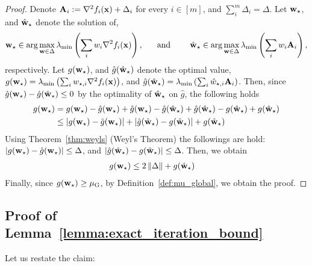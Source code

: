 \begin{proof}
    
Denote ${\mathbf{A}}_i := \nabla^2 f_i({\mathbf{x}}) + \Delta_i$ for every $i\in [m]$, and $\sum_i^m \Delta_i = \Delta$. Let ${\mathbf{w}}_\star $, and $\hat{{\mathbf{w}}}_\star$ denote the solution of,
    \begin{align*}
        {\mathbf{w}}_\star \in \arg\max_{{\mathbf{w}}\in \Delta} \lambda_{\min}\left(\sum_i w_i \nabla^2 f_i({\mathbf{x}})\right), ~~~~~ \text{and} ~~~~~~~ \hat{{\mathbf{w}}}_\star \in \arg\max_{{\mathbf{w}}\in \Delta} \lambda_{\min}\left(\sum_i w_i {\mathbf{A}}_i\right),
    \end{align*}
    respectively. Let $g({\mathbf{w}}_\star)$, and $\hat{g}(\hat{{\mathbf{w}}}_\star)$ denote the optimal value, $g({\mathbf{w}}_\star) = \lambda_{\min} \left(\sum_i w_{\star, i}  \nabla^2 f_i({\mathbf{x}})\right)$, and $\hat{g}(\hat{{\mathbf{w}}}_\star) = \lambda_{\min} \left(\sum_i \hat{w}_{\star, i} {\mathbf{A}}_i\right)$. Then, since $\hat{g}({\mathbf{w}}_\star) -\hat{g}(\hat{{\mathbf{w}}}_\star)\leq 0$ by the optimality of $\hat{{\mathbf{w}}}_\star$ on $\hat{g}$, the following holds
    \begin{align*}
        g({\mathbf{w}}_\star) & = g({\mathbf{w}}_\star) - \hat{g}({\mathbf{w}}_\star) + \hat{g}({\mathbf{w}}_\star) -\hat{g}(\hat{{\mathbf{w}}}_\star) +\hat{g}(\hat{{\mathbf{w}}}_\star) - g(\hat{{\mathbf{w}}}_\star) +g(\hat{{\mathbf{w}}}_\star) \\
        & \leq |g({\mathbf{w}}_\star) - \hat{g}({\mathbf{w}}_\star)|  + |\hat{g}(\hat{{\mathbf{w}}}_\star) - g(\hat{{\mathbf{w}}}_\star)| +g(\hat{{\mathbf{w}}}_\star)\\
    \end{align*}
    Using Theorem~\ref{thm:weyls} (Weyl's Theorem) the followings are hold: $|g({\mathbf{w}}_\star) - \hat{g}({\mathbf{w}}_\star)| \leq \Delta$, and $|\hat{g}(\hat{{\mathbf{w}}}_\star) - g(\hat{{\mathbf{w}}}_\star)| \leq \Delta$. Then, we obtain 
    \begin{align*}
        g({\mathbf{w}}_\star) & \leq 2\left\Vert\Delta\right\Vert +g(\hat{{\mathbf{w}}}_\star)
    \end{align*}
    Finally, since $g({\mathbf{w}}_\star)\geq {\mu_{\mathrm{G}}}$, by Definition~\ref{def:mu_global}, we obtain the proof.
\end{proof}


\subsection{Proof of Lemma~\ref{lemma:exact_iteration_bound}}\label{app:exact_iteration_bound_proof}
Let us restate the claim:

\ExactIterationBound*

